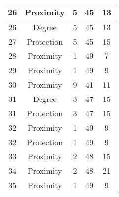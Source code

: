 \documentclass[results.tex]{subfiles}
\begin{document}
\begin{center}
\begin{tabular}{| c || c | c | c | c |}
            \hline
            26                      & Proximity                    & 5                      & 45                      & 13                   \\
            \hline
            26                      & Degree                       & 5                      & 45                      & 13                   \\
            \hline
            27                      & Protection                   & 5                      & 45                      & 15                   \\
            \hline
            28                      & Proximity                    & 1                      & 49                      & 7                    \\
            \hline
            29                      & Proximity                    & 1                      & 49                      & 9                    \\
            \hline
            30                      & Proximity                    & 9                      & 41                      & 11                   \\
            \hline
            31                      & Degree                       & 3                      & 47                      & 15                   \\
            \hline
            31                      & Protection                   & 3                      & 47                      & 15                   \\
            \hline
            32                      & Proximity                    & 1                      & 49                      & 9                    \\
            \hline
            32                      & Protection                   & 1                      & 49                      & 9                    \\
            \hline
            33                      & Proximity                    & 2                      & 48                      & 15                   \\
            \hline
            34                      & Proximity                    & 2                      & 48                      & 21                   \\
            \hline
            35                      & Proximity                    & 1                      & 49                      & 9                    \\

\end{tabular}
\end{center}
\end{document}
